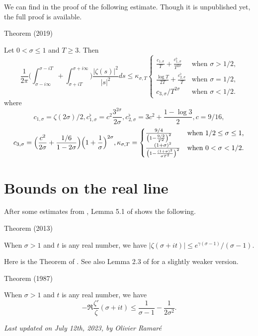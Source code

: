 We can find in
\cite{Helgott*17u} the proof
of the following estimate. Though it is unpublished yet, the full proof
is available.
\begin{thm}{Theorem (2019)}

Let $0 < \sigma\le1$ and $T \ge 3$. Then
  $$
    \frac{1}{2\pi}\biggl(
    \int_{\sigma-i\infty}^{\sigma-iT}
    +
    \int^{\sigma+i\infty}_{\sigma+iT}
    \biggr)
    \frac{|\zeta(s)|^2}{|s|^2}ds\le
    \kappa_{\sigma,T}
    \begin{cases}
    \frac{c_{1,\sigma}}{T}+\frac{c^\flat_{1,\sigma}}{T^{2\sigma}}
    &\text{when $\sigma > 1/2$,}\\
    \frac{\log T}{2T}+\frac{c^\flat_{2,\sigma}}{T}
    &\text{when $\sigma=1/2$,}\\
    c_{3,\sigma}/T^{2\sigma}&\text{when $\sigma < 1/2$.}
    \end{cases}
  $$
 where
$$
c_{1,\sigma}=\zeta(2\sigma)/2,
 c_{1,\sigma}^\flat=c^2 \frac{3^{2\sigma}}{2\sigma},
  c_{2,\sigma}^\flat=3c^2+\frac{1-\log 3}{2},
c=9/16,						  
 $$
 $$
 c_{3,\sigma}=
\Bigl(\frac{c^2}{2\sigma}+\frac{1/6}{1-2\sigma}\Bigr)
\Bigl(1+\frac{1}{\sigma}\Bigr)^{2\sigma},
\kappa_{\sigma,T}=
\begin{cases}
\frac{9/4}{\left(1-\frac{9/2}{T^2}\right)^2}
&\text{when $1/2\le \sigma\le 1$,}\\
\frac{(1+\sigma)^2}{\left(1-\frac{(1+\sigma)^2}{\sigma T^2}\right)^2}
&\text{when $0 < \sigma < 1/2$.}
 \end{cases}
 $$
						  
\end{thm}





\par 
\section{Bounds on the real line}


After some estimates
from \cite{Bastion-Rogalaski*02}, 
Lemma 5.1 of \cite{Ramare*13d} shows
the following.
\par 
\begin{thm}{Theorem (2013)}

  When $\sigma> 1$ and $t$ is any real number, we have $|\zeta(\sigma+it)|\le   e^{\gamma(\sigma-1) }/(\sigma-1)$.
\end{thm}


Here is the Theorem of
\cite{Delange*87}.
See also Lemma 2.3 of
\cite{Ford*01} for a
slightly weaker version.
\par 
\begin{thm}{Theorem (1987)}

  When $\sigma> 1$ and $t$ is any real number, we have
  $$
  -\Re\frac{\zeta'}{\zeta}(\sigma+it)\le
  \frac{1}{\sigma-1}-\frac{1}{2\sigma^2}.
  $$ 
\end{thm}








  
\begin{flushright}\small\sl{}   Last updated on July 12th, 2023, by Olivier Ramar\'e
 \end{flushright}















